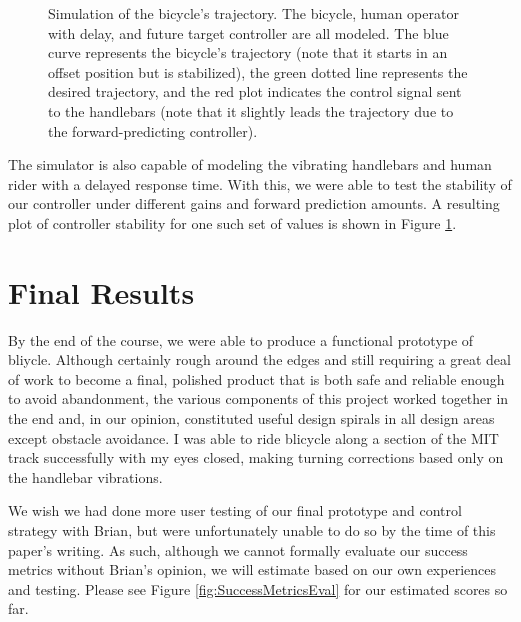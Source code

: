 \documentclass[aps,twocolumn,secnumarabic,balancelastpage,amsmath,amssymb,nofootinbib]{revtex4-1}
\begin{document}
\begin{figure}
\caption{Simulation of the bicycle's trajectory. The bicycle, human operator with delay, and future target controller are all modeled. The blue curve represents the bicycle's trajectory (note that it starts in an offset position but is stabilized), the green dotted line represents the desired trajectory, and the red plot indicates the control signal sent to the handlebars (note that it slightly leads the trajectory due to the forward-predicting controller).}
\label{fig:ControllerStabilized}
\end{figure}

The simulator is also capable of modeling the vibrating handlebars and human rider with a delayed response time. With this, we were able to test the stability of our controller under different gains and forward prediction amounts. A resulting plot of controller stability for one such set of values is shown in Figure \ref{fig:ControllerStabilized}.


\section{Final Results}
By the end of the course, we were able to produce a functional prototype of bliycle. Although certainly rough around the edges and still requiring a great deal of work to become a final, polished product that is both safe and reliable enough to avoid abandonment, the various components of this project worked together in the end and, in our opinion, constituted useful design spirals in all design areas except obstacle avoidance. I was able to ride blicycle along a section of the MIT track successfully with my eyes closed, making turning corrections based only on the handlebar vibrations.

We wish we had done more user testing of our final prototype and control strategy with Brian, but were unfortunately unable to do so by the time of this paper's writing. As such, although we cannot formally evaluate our success metrics without Brian's opinion, we will estimate based on our own experiences and testing. Please see Figure \ref{fig:SuccessMetricsEval} for our estimated scores so far.
\end{document}

